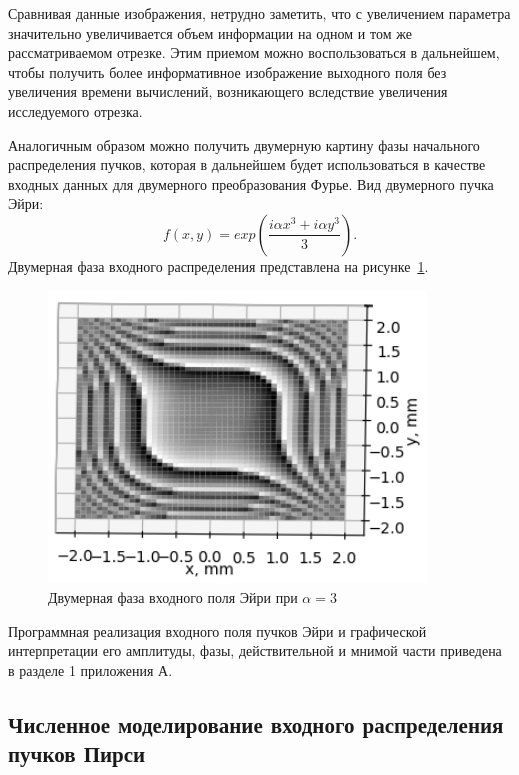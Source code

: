{\begin{figure}[H]
    \end{figure}

    Сравнивая данные изображения, нетрудно заметить, что с увеличением
    параметра значительно увеличивается объем информации на одном и том же
    рассматриваемом отрезке. Этим приемом можно воспользоваться в
    дальнейшем, чтобы получить более информативное изображение выходного поля без увеличения времени вычислений, возникающего вследствие
    увеличения исследуемого отрезка.

    Аналогичным образом можно получить двумерную картину фазы начального распределения пучков,
    которая в дальнейшем будет использоваться в качестве входных данных для двумерного преобразования Фурье.
    Вид двумерного пучка Эйри:
    \begin{equation*}
        \label{zero_time_condition}
        f(x, y) = exp(\frac{i \alpha x^3 + i \alpha y^3}{3}).
    \end{equation*}
    Двумерная фаза входного распределения представлена на рисунке~\ref{airy_phase_2d}.

    \begin{figure}[H]
        \begin{center}
            \includegraphics[width=10cm]{plots/airy_phase_2d_ortho}
            \caption{Двумерная фаза входного поля Эйри при $\alpha  = 3$}
            \label{airy_phase_2d}
        \end{center}

    \end{figure}

    Программная реализация входного поля пучков Эйри и графической
    интерпретации его амплитуды, фазы, действительной и мнимой части
    приведена в разделе 1 приложения А.


    \subsection{Численное моделирование входного распределения пучков Пирси}
    {

}}
